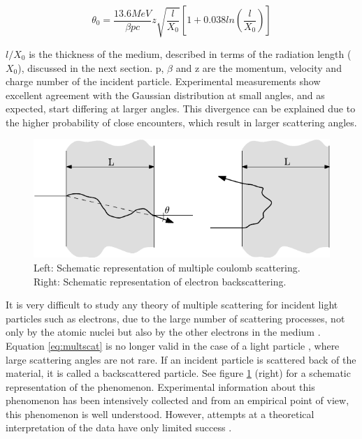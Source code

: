 \begin{equation}
    \theta_0 = \frac{13.6 MeV}{\beta p c} z \sqrt{\frac{l}{X_0}}\left[ 1+0.038ln\left(\frac{l}{X_0}\right)\right] 
    \label{eq:multscat}
\end{equation}

$l/X_0$ is the thickness of the medium, described in terms of the radiation length ($X_0$), discussed in the next section. p, $\beta$ and z are the momentum, velocity and charge number of the incident particle. Experimental measurements show excellent agreement with the Gaussian distribution at small angles, and as expected, start differing at larger angles. This divergence can be explained due to the higher probability of close encounters, which result in larger scattering angles. 

\begin{figure}[h]
    \centering
    \includegraphics[width=0.78\columnwidth]{MultipleCoulombScat/MultipleScat.pdf}
    \caption{Left: Schematic representation of multiple coulomb scattering. Right: Schematic representation of electron backscattering.}
    \label{fig:PartScattering}
\end{figure}

It is very difficult to study any theory of multiple scattering for incident light particles such as electrons, due to the large number of scattering processes, not only by the atomic nuclei but also by the other electrons in the medium \parencite*[][]{ref:MultipleElec1}. Equation \ref{eq:multscat} is no longer valid in the case of a light particle \parencite*[][]{ref:MultipleElec2}, where large scattering angles are not rare. If an incident particle is scattered back of the material, it is called a backscattered particle. See figure \ref{fig:PartScattering} (right) for a schematic representation of the phenomenon.  Experimental information about this phenomenon has been intensively collected and from an empirical point of view, this phenomenon is well understood. However, attempts at a theoretical interpretation of the data have only limited success \parencite[][]{ref:BackScatTheo}.

